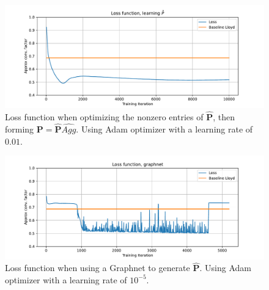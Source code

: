 \documentclass{article}
\newcommand{\mat}[1]{\bm{{#1}}}
\begin{document}
\begin{figure}[h]
  \includegraphics[width=\textwidth]{figures/learn_p_hat.pdf}
  \caption{Loss function when optimizing the nonzero entries of $\mat{\hat{P}}$, then forming $\mat{P}=\mat{\hat{P}}\hat{Agg}$.  Using Adam optimizer with a learning rate of $0.01$.}
  \label{fig:loss_p_hat}
\end{figure}

\begin{figure}[h]
  \includegraphics[width=\textwidth]{figures/learn_graphnet.pdf}
  \caption{Loss function when using a Graphnet to generate $\mat{\hat{P}}$.  Using Adam optimizer with a learning rate of $10^{-5}$.}
  \label{fig:loss_graphnet}
\end{figure}
\end{document}
